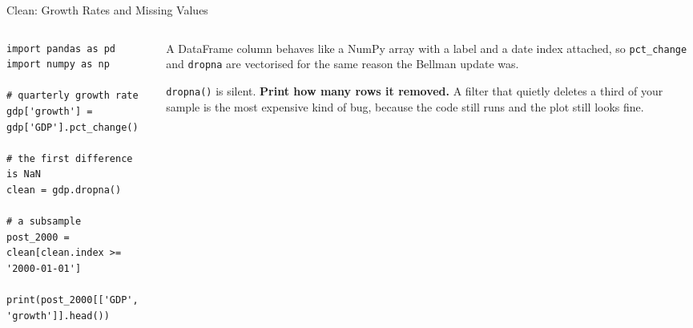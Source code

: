 \begin{frame}[fragile]{Clean: Growth Rates and Missing Values}
\begin{columns}[T]
\begin{column}{0.53\textwidth}
\begin{lstlisting}
import pandas as pd
import numpy as np

# quarterly growth rate
gdp['growth'] = gdp['GDP'].pct_change()

# the first difference is NaN
clean = gdp.dropna()

# a subsample
post_2000 = clean[clean.index >= '2000-01-01']

print(post_2000[['GDP', 'growth']].head())
\end{lstlisting}
\end{column}
\begin{column}{0.44\textwidth}
\small
A DataFrame column behaves like a NumPy array with a label and a date index attached, so \texttt{pct\_change} and \texttt{dropna} are vectorised for the same reason the Bellman update was.
\medskip
\begin{cautionbox}\footnotesize
\texttt{dropna()} is silent. \textbf{Print how many rows it removed.} A filter that quietly deletes a third of your sample is the most expensive kind of bug, because the code still runs and the plot still looks fine.
\end{cautionbox}
\end{column}
\end{columns}
\vspace{1mm}
\end{frame}

